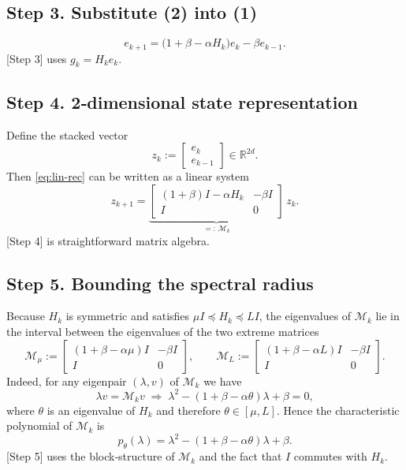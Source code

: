 \documentclass[11pt]{article}
\newcommand{\R}{\mathbb{R}}
\begin{document}
\subsection*{Step 3.  Substitute (2) into (1)}
\begin{equation}
e_{k+1}= \bigl(1+\beta-\alpha H_k\bigr)e_k -\beta e_{k-1}. \label{eq:lin-rec}
\end{equation}
[Step 3] uses $g_k=H_k e_k$.

\subsection*{Step 4.  2‑dimensional state representation}
Define the stacked vector
\[
z_k:=\begin{bmatrix}e_k\\ e_{k-1}\end{bmatrix}\in\R^{2d}.
\]
Then \eqref{eq:lin-rec} can be written as a linear system
\[
z_{k+1}= \underbrace{\begin{bmatrix}
(1+\beta)I-\alpha H_k & -\beta I\\[1mm]
I & 0
\end{bmatrix}}_{=:\,\mathcal{M}_k}\,z_k .
\tag{3}
\]
[Step 4] is straightforward matrix algebra.

\subsection*{Step 5.  Bounding the spectral radius}
Because $H_k$ is symmetric and satisfies $\mu I\preceq H_k\preceq L I$, the eigenvalues of $\mathcal{M}_k$ lie in the interval between the eigenvalues of the two extreme matrices
\[
\mathcal{M}_\mu:=\begin{bmatrix}
(1+\beta-\alpha\mu)I & -\beta I\\[1mm]
I & 0
\end{bmatrix},
\qquad
\mathcal{M}_L:=\begin{bmatrix}
(1+\beta-\alpha L)I & -\beta I\\[1mm]
I & 0
\end{bmatrix}.
\tag{4}
\]
Indeed, for any eigenpair $(\lambda,v)$ of $\mathcal{M}_k$ we have
\[
\lambda v = \mathcal{M}_k v
\;\Longrightarrow\;
\lambda^2 - (1+\beta-\alpha \theta)\lambda +\beta =0,
\]
where $\theta$ is an eigenvalue of $H_k$ and therefore $\theta\in[\mu,L]$.  Hence the characteristic polynomial of $\mathcal{M}_k$ is
\[
p_{\theta}(\lambda)=\lambda^2-(1+\beta-\alpha\theta)\lambda+\beta .
\tag{5}
\]
[Step 5] uses the block‑structure of $\mathcal{M}_k$ and the fact that $I$ commutes with $H_k$.
\end{document}
